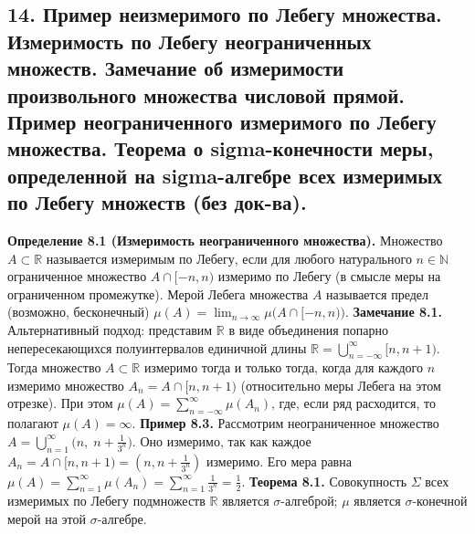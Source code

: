 \documentclass[12pt]{article}
\begin{document}
\subsection*{14. Пример неизмеримого по Лебегу множества. Измеримость по Лебегу неограниченных
множеств. Замечание об измеримости произвольного множества числовой прямой.
Пример неограниченного измеримого по Лебегу множества. Теорема о sigma-конечности
меры, определенной на sigma-алгебре всех измеримых по Лебегу множеств (без док-ва).}
\textbf{Определение 8.1 (Измеримость неограниченного множества).} Множество \(A\subset\mathbb{R}\) называется измеримым по Лебегу, если для любого натурального \(n\in\mathbb{N}\) ограниченное множество \(A\cap[-n,n)\) измеримо по Лебегу (в смысле меры на ограниченном промежутке). Мерой Лебега множества \(A\) называется предел (возможно, бесконечный) \(\mu(A)=\lim_{n\to\infty}\mu\bigl(A\cap[-n,n)\bigr)\). \textbf{Замечание 8.1.} Альтернативный подход: представим \(\mathbb{R}\) в виде объединения попарно непересекающихся полуинтервалов единичной длины \(\mathbb{R}=\bigcup_{n=-\infty}^{\infty}[n,n+1)\). Тогда множество \(A\subset\mathbb{R}\) измеримо тогда и только тогда, когда для каждого \(n\) измеримо множество \(A_n=A\cap[n,n+1)\) (относительно меры Лебега на этом отрезке). При этом \(\mu(A)=\sum_{n=-\infty}^{\infty}\mu(A_n)\), где, если ряд расходится, то полагают \(\mu(A)=\infty\). \textbf{Пример 8.3.} Рассмотрим неограниченное множество \(A=\bigcup_{n=1}^{\infty}\bigl(n,\;n+\tfrac{1}{3^{n}}\bigr)\). Оно измеримо, так как каждое \(A_n=A\cap[n,n+1)=(n,n+\tfrac{1}{3^{n}})\) измеримо. Его мера равна \(\mu(A)=\sum_{n=1}^{\infty}\mu(A_n)=\sum_{n=1}^{\infty}\tfrac{1}{3^{n}}=\tfrac{1}{2}\). \textbf{Теорема 8.1.} Совокупность \(\Sigma\) всех измеримых по Лебегу подмножеств \(\mathbb{R}\) является \(\sigma\)-алгеброй; \(\mu\) является \(\sigma\)-конечной мерой на этой \(\sigma\)-алгебре.

\end{document}
